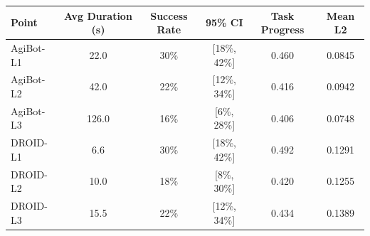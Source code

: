\begin{tabular}{lccccc}
\hline
Point & Avg Duration (s) & Success Rate & 95\% CI & Task Progress & Mean L2 \\
\hline
AgiBot-L1 & 22.0 & 30\% & [18\%, 42\%] & 0.460 & 0.0845 \\
AgiBot-L2 & 42.0 & 22\% & [12\%, 34\%] & 0.416 & 0.0942 \\
AgiBot-L3 & 126.0 & 16\% & [6\%, 28\%] & 0.406 & 0.0748 \\
DROID-L1 & 6.6 & 30\% & [18\%, 42\%] & 0.492 & 0.1291 \\
DROID-L2 & 10.0 & 18\% & [8\%, 30\%] & 0.420 & 0.1255 \\
DROID-L3 & 15.5 & 22\% & [12\%, 34\%] & 0.434 & 0.1389 \\
\hline
\end{tabular}
